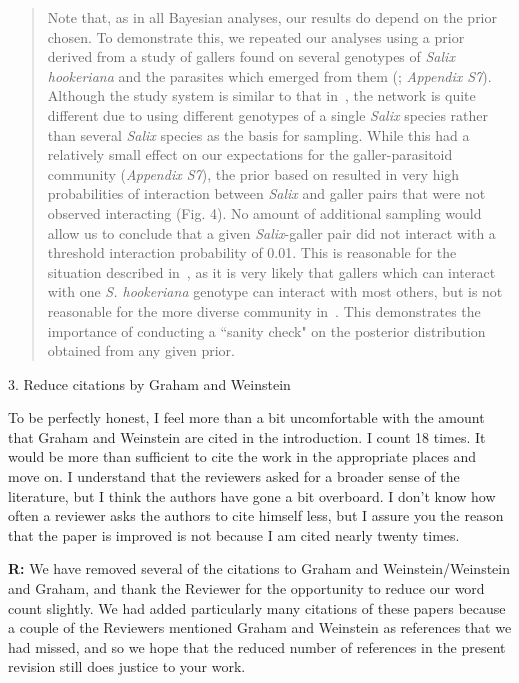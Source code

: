 \documentclass[12pt]{letter}
\newenvironment{refquote}{\bigskip \begin{it}}{\end{it}\smallskip}
\begin{document}
		\begin{quotation}

		  Note that, as in all Bayesian analyses, our results do depend on the prior chosen. To demonstrate this, we repeated our analyses using a prior derived from a study of gallers found on several genotypes of \emph{Salix hookeriana} and the parasites which emerged from them (\citealp{Barbour2016,Barbour2016Dryad}; \emph{Appendix S7}). Although the study system is similar to that in~\citet{Kopelke2017}, the network is quite different due to using different genotypes of a single \emph{Salix} species rather than several \emph{Salix} species as the basis for sampling. While this had a relatively small effect on our expectations for the galler-parasitoid community (\emph{Appendix S7}), the prior based on \citep{Barbour2016} resulted in very high probabilities of interaction between \emph{Salix} and galler pairs that were not observed interacting (Fig. 4). No amount of additional sampling would allow us to conclude that a given \emph{Salix}-galler pair did not interact with a threshold interaction probability of 0.01. This is reasonable for the situation described in~\citet{Barbour2016}, as it is very likely that gallers which can interact with one \emph{S. hookeriana} genotype can interact with most others, but is not reasonable for the more diverse community in~\citet{Kopelke2017}. This demonstrates the importance of conducting a ``sanity check" on the posterior distribution obtained from any given prior.

		\end{quotation}



	3. Reduce citations by Graham and Weinstein 

		\begin{refquote}

			To be perfectly honest, I feel more than a bit uncomfortable with the amount that Graham and Weinstein are cited in the introduction. I count 18 times. It would be more than sufficient to cite the work in the appropriate places and move on. I understand that the reviewers asked for a broader sense of the literature, but I think the authors have gone a bit overboard. I don’t know how often a reviewer asks the authors to cite himself less, but I assure you the reason that the paper is improved is not because I am cited nearly twenty times.


		\end{refquote}

		\textbf{R:} We have removed several of the citations to Graham and Weinstein/Weinstein and Graham, and thank the Reviewer for the opportunity to reduce our word count slightly. We had added particularly many citations of these papers because a couple of the Reviewers mentioned Graham and Weinstein as references that we had missed, and so we hope that the reduced number of references in the present revision still does justice to your work.



\clearpage

     
\end{document}
